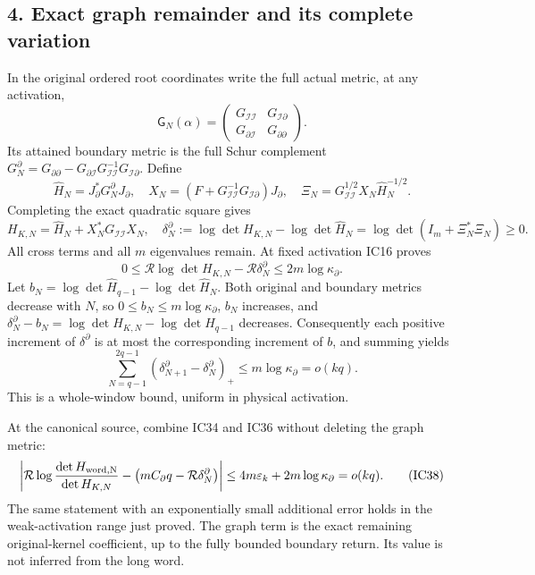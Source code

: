 \documentclass[11pt]{article}
\begin{document}
\subsection{4. Exact graph remainder and its complete variation}\label{exact-graph-remainder-and-its-complete-variation}

In the original ordered root coordinates write the full actual metric, at any activation, \[
\mathsf G_N(\alpha)=
\begin{pmatrix}G_{\mathcal I\mathcal I}&G_{\mathcal I\partial}\\
G_{\partial\mathcal I}&G_{\partial\partial}\end{pmatrix}.
\] Its attained boundary metric is the full Schur complement \(G_N^\partial=G_{\partial\partial}
-G_{\partial\mathcal I}G_{\mathcal I\mathcal I}^{-1}G_{\mathcal I\partial}\). Define \[
\widehat H_N=J_\partial^*G_N^\partial J_\partial,\quad
X_N=(F+G_{\mathcal I\mathcal I}^{-1}G_{\mathcal I\partial})J_\partial,\quad
\Xi_N=G_{\mathcal I\mathcal I}^{1/2}X_N\widehat H_N^{-1/2}.
\] Completing the exact quadratic square gives \[
H_{K,N}=\widehat H_N+X_N^*G_{\mathcal I\mathcal I}X_N,\quad
\delta_N^\partial:=\log\det H_{K,N}-\log\det\widehat H_N
=\log\det(I_m+\Xi_N^*\Xi_N)\ge0.
\tag{IC35}
\] All cross terms and all \(m\) eigenvalues remain. At fixed activation IC16 proves \[
0\le\mathcal R\log\det H_{K,N}-\mathcal R\delta_N^\partial
\le2m\log\kappa_\partial.
\tag{IC36}
\] Let \(b_N=\log\det\widehat H_{q-1}-\log\det\widehat H_N\). Both original and boundary metrics decrease with \(N\), so \(0\le b_N\le m\log\kappa_\partial\), \(b_N\) increases, and \(\delta_N^\partial-b_N=\log\det H_{K,N}-\log\det\widehat H_{q-1}\) decreases. Consequently each positive increment of \(\delta^\partial\) is at most the corresponding increment of \(b\), and summing yields \[
\sum_{N=q-1}^{2q-1}(\delta_{N+1}^\partial-\delta_N^\partial)_+
\le m\log\kappa_\partial=o(kq).
\tag{IC37}
\] This is a whole-window bound, uniform in physical activation.

At the canonical source, combine IC34 and IC36 without deleting the graph metric: \[
\left|\mathcal R\log\frac{\det H_{\rm word,N}}{\det H_{K,N}}
-\left(mC_\partial q-\mathcal R\delta_N^\partial\right)\right|
\le4m\varepsilon_k+2m\log\kappa_\partial=o(kq).
\tag{IC38}
\] The same statement with an exponentially small additional error holds in the weak-activation range just proved. The graph term is the exact remaining original-kernel coefficient, up to the fully bounded boundary return. Its value is not inferred from the long word.
\end{document}
